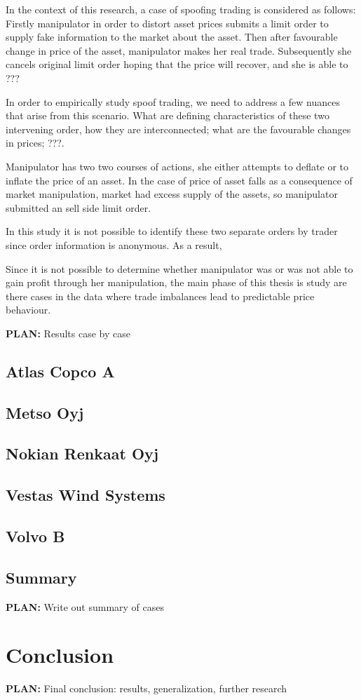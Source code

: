 \documentclass{tut-thesis}
\begin{document}
In the context of this research, a case of spoofing trading is considered as follows: Firstly manipulator in order to distort asset prices submits a limit order to supply fake information to the market about the asset. Then after favourable change in price of the asset, manipulator makes her real trade. Subsequently she cancels original limit order hoping that the price will recover, and she is able to ???

In order to empirically study spoof trading, we need to address a few nuances that arise from this scenario. What are defining characteristics of these two intervening order, how they are interconnected; what are the favourable changes in prices; ???. 

Manipulator has two two courses of actions, she either attempts to deflate or to inflate the price of an asset. In the case of price of asset falls as a consequence of market manipulation, market had excess supply of the assets, so manipulator submitted an sell side limit order. 

In this study it is not possible to identify these two separate orders by trader since order information is anonymous. As a result, 

Since it is not possible to determine whether manipulator was or was not able to gain profit through her manipulation, the main phase of this thesis is study are there cases in the data where trade imbalances lead to predictable price behaviour.

\textbf{PLAN:} Results case by case
\section{Atlas Copco A}
\section{Metso Oyj}
\section{Nokian Renkaat Oyj}
\section{Vestas Wind Systems}
\section{Volvo B}

\section{Summary}
\textbf{PLAN:} Write out summary of cases

\chapter{Conclusion}
\textbf{PLAN:} Final conclusion: results, generalization, further research

\begingroup
\let\itshape\upshape
\printbibliography{}
\endgroup
\end{document}
